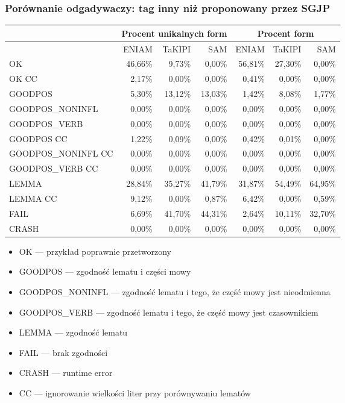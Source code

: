\documentclass{beamer}
\begin{document}
\begin{frame}
\frametitle{Porównanie odgadywaczy: tag inny niż proponowany przez SGJP}
\begin{center}\begin{scriptsize}
\begin{tabular}{l|rrr|rrr}
& \multicolumn{3}{c|}{Procent unikalnych form} &
\multicolumn{3}{c}{Procent form} \\
\hline
& ENIAM & TaKIPI & SAM & ENIAM & TaKIPI & SAM \\
\hline
OK & 46,66\% & 9,73\% & 0,00\% & 56,81\% & 27,30\% & 0,00\% \\
OK CC & 2,17\% & 0,00\% & 0,00\% & 0,41\% & 0,00\% & 0,00\% \\
GOODPOS & 5,30\% & 13,12\% & 13,03\% & 1,42\% & 8,08\% & 1,77\% \\
GOODPOS\_NONINFL & 0,00\% & 0,00\% & 0,00\% & 0,00\% & 0,00\% & 0,00\% \\
GOODPOS\_VERB & 0,00\% & 0,00\% & 0,00\% & 0,00\% & 0,00\% & 0,00\% \\
GOODPOS CC & 1,22\% & 0,09\% & 0,00\% & 0,42\% & 0,01\% & 0,00\% \\
GOODPOS\_NONINFL CC & 0,00\% & 0,00\% & 0,00\% & 0,00\% & 0,00\% & 0,00\% \\
GOODPOS\_VERB CC & 0,00\% & 0,00\% & 0,00\% & 0,00\% & 0,00\% & 0,00\% \\
LEMMA & 28,84\% & 35,27\% & 41,79\% & 31,87\% & 54,49\% & 64,95\% \\
LEMMA CC & 9,12\% & 0,00\% & 0,87\% & 6,42\% & 0,00\% & 0,59\% \\
FAIL & 6,69\% & 41,70\% & 44,31\% & 2,64\% & 10,11\% & 32,70\% \\
CRASH & 0,00\% & 0,00\% & 0,00\% & 0,00\% & 0,00\% & 0,00\% \\
\end{tabular}
\end{scriptsize}\end{center}
\begin{scriptsize}\begin{itemize}
\item OK --- przykład poprawnie przetworzony
\item GOODPOS --- zgodność lematu i części mowy
\item GOODPOS\_NONINFL --- zgodność lematu i tego, że część mowy jest nieodmienna
\item GOODPOS\_VERB --- zgodność lematu i tego, że część mowy jest czasownikiem
\item LEMMA --- zgodność lematu
\item FAIL --- brak zgodności
\item CRASH --- runtime error
\item CC --- ignorowanie wielkości liter przy porównywaniu lematów
\end{itemize}\end{scriptsize}
\end{frame}
\end{document}
